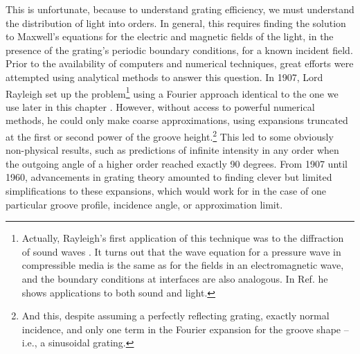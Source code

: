 This is unfortunate, because to understand grating efficiency, we must understand the distribution of light into orders.  In general, this requires finding the solution to Maxwell's equations for the electric and magnetic fields of the light, in the presence of the grating's periodic boundary conditions, for a known incident field.  Prior to the availability of computers and numerical techniques, great efforts were attempted using analytical methods to answer this question.  In 1907, Lord Rayleigh set up the problem\footnote{Actually, Rayleigh's first application of this technique was to the diffraction of sound waves \cite{Ray86}.  It turns out that the wave equation for a pressure wave in compressible media is the same as for the fields in an electromagnetic wave, and the boundary conditions at interfaces are also analogous. In Ref. \cite{Ray07} he shows applications to both sound and light.} using a Fourier approach identical to the one we use later in this chapter \cite{Ray07}.  However, without access to powerful numerical methods, he could only make coarse approximations, using expansions truncated at the first or second power of the groove height.\footnote{And this, despite assuming a perfectly reflecting grating, exactly normal incidence, and only one term in the Fourier expansion for the groove shape -- i.e., a sinusoidal grating.}  This led to some obviously non-physical results, such as predictions of infinite intensity in any order when the outgoing angle of a higher order reached exactly 90 degrees.  From 1907 until 1960, advancements in grating theory amounted to finding clever but limited simplifications to these expansions, which would work for in the case of one particular groove profile, incidence angle, or approximation limit.

